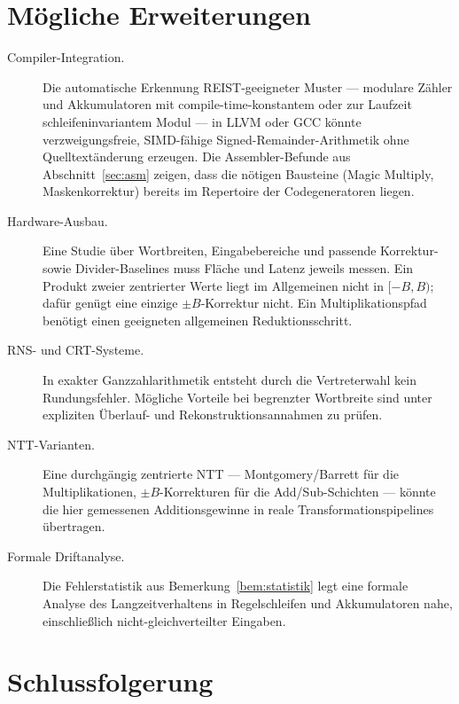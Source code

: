 \documentclass[11pt,a4paper]{scrartcl}
\theoremstyle{definition}
\theoremstyle{plain}
\theoremstyle{remark}
\begin{document}
\section{Mögliche Erweiterungen}
\label{sec:erweiterungen}

\begin{description}
\item[Compiler-Integration.] Die automatische Erkennung REIST-geeigneter Muster --- modulare Zähler und Akkumulatoren mit compile-time-konstantem oder zur Laufzeit schleifeninvariantem Modul --- in LLVM oder GCC könnte verzweigungsfreie, SIMD-fähige Signed-Remainder-Arithmetik ohne Quelltextänderung erzeugen. Die Assembler-Befunde aus Abschnitt~\ref{sec:asm} zeigen, dass die nötigen Bausteine (Magic Multiply, Maskenkorrektur) bereits im Repertoire der Codegeneratoren liegen.
\item[Hardware-Ausbau.] Eine Studie über Wortbreiten, Eingabebereiche und passende Korrektur- sowie Divider-Baselines muss Fläche und Latenz jeweils messen. Ein Produkt zweier zentrierter Werte liegt im Allgemeinen nicht in $[-B,B)$; dafür genügt eine einzige $\pm B$-Korrektur nicht. Ein Multiplikationspfad benötigt einen geeigneten allgemeinen Reduktionsschritt.
\item[RNS- und CRT-Systeme.] In exakter Ganzzahlarithmetik entsteht durch die Vertreterwahl kein Rundungsfehler. Mögliche Vorteile bei begrenzter Wortbreite sind unter expliziten Überlauf- und Rekonstruktionsannahmen zu prüfen.

\item[NTT-Varianten.] Eine durchgängig zentrierte NTT --- Montgomery/Barrett für die Multiplikationen, $\pm B$-Korrekturen für die Add/Sub-Schichten --- könnte die hier gemessenen Additionsgewinne in reale Transformationspipelines übertragen.
\item[Formale Driftanalyse.] Die Fehlerstatistik aus Bemerkung~\ref{bem:statistik} legt eine formale Analyse des Langzeitverhaltens in Regelschleifen und Akkumulatoren nahe, einschließlich nicht-gleichverteilter Eingaben.
\end{description}



\section{Schlussfolgerung}
\label{sec:schluss}
\end{document}
